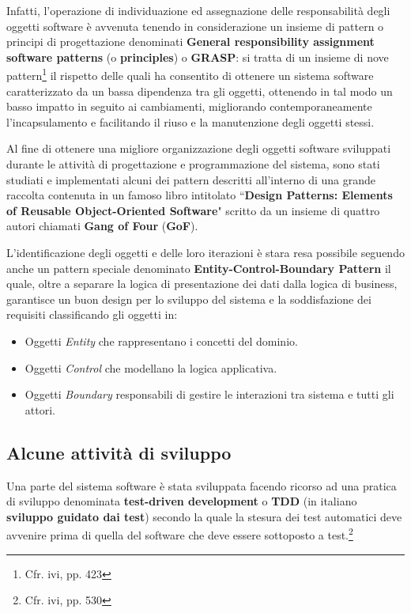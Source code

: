 \documentclass[10pt,a4paper, titlepage]{article}
\begin{document}
Infatti, l'operazione di individuazione ed assegnazione delle responsabilità degli oggetti software è avvenuta tenendo in considerazione un insieme di pattern o principi di progettazione denominati \textbf{General responsibility assignment software patterns} (o \textbf{principles}) o \textbf{GRASP}: si tratta di un insieme di nove pattern\footnote{Cfr. ivi, pp. 423} il rispetto delle quali ha consentito di ottenere un sistema software caratterizzato da un bassa dipendenza tra gli oggetti, ottenendo in tal modo un basso impatto in seguito ai cambiamenti, migliorando contemporaneamente l'incapsulamento e facilitando il riuso e la manutenzione degli oggetti stessi.

Al fine di ottenere una migliore organizzazione degli oggetti software sviluppati durante le attività di progettazione e programmazione del sistema, sono stati studiati e implementati alcuni dei pattern descritti all'interno di una grande raccolta contenuta in un famoso libro intitolato ``\textbf{Design Patterns: Elements of Reusable Object-Oriented Software}" scritto da un insieme di quattro autori chiamati \textbf{Gang of Four} (\textbf{GoF}).

L'identificazione degli oggetti e delle loro iterazioni è stara resa possibile seguendo anche un pattern speciale denominato \textbf{Entity-Control-Boundary Pattern} il quale, oltre a separare la logica di presentazione dei dati dalla logica di business, garantisce un buon design per lo sviluppo del sistema e la soddisfazione dei requisiti classificando gli oggetti in:

\begin{itemize}
\item Oggetti \textit{Entity} che rappresentano i concetti del dominio.
\item Oggetti \textit{Control} che modellano la logica applicativa.
\item Oggetti \textit{Boundary} responsabili di gestire le interazioni tra sistema e tutti gli attori.
\end{itemize}


\subsection{Alcune attività di sviluppo}

Una parte del sistema software è stata sviluppata facendo ricorso ad una pratica di sviluppo denominata \textbf{test-driven development} o \textbf{TDD} (in italiano \textbf{sviluppo guidato dai test}) secondo la quale la stesura dei test automatici deve avvenire prima di quella del software che deve essere sottoposto a test.\footnote{Cfr. ivi, pp. 530}
\end{document}
